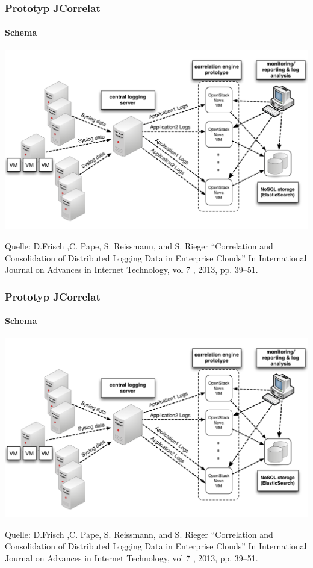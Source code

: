 \documentclass[10pt]{beamer} %
\begin{document}
\begin{frame}
\frametitle{Prototyp JCorrelat}
\framesubtitle{Schema}


 \includegraphics[scale=0.25]{img/schema_correlat-00.png}
\vspace{0.5cm}

\footnoterule
\footnotesize{
    Quelle:
    D.Frisch ,C. Pape, S. Reissmann, and S. Rieger “Correlation and
    Consolidation of Distributed Logging Data in Enterprise Clouds” In International
    Journal on Advances in Internet Technology, vol 7 , 2013, pp. 39–51.}

\end{frame}
\begin{frame}
\frametitle{Prototyp JCorrelat}
\framesubtitle{Schema}


\includegraphics[scale=0.25]{img/schema_correlat-00.png}
\vspace{0.5cm}

\footnoterule
\footnotesize{
    Quelle:
    D.Frisch ,C. Pape, S. Reissmann, and S. Rieger “Correlation and
    Consolidation of Distributed Logging Data in Enterprise Clouds” In International
    Journal on Advances in Internet Technology, vol 7 , 2013, pp. 39–51.}

\end{frame}
\end{document}
